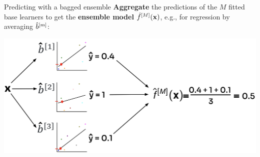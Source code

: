 \documentclass[11pt,compress,t,notes=noshow, xcolor=table]{beamer}
\begin{document}
\begin{vbframe}{Predicting with a bagged ensemble}
\textbf{Aggregate} the predictions of the $M$ fitted base learners to get the \textbf{ensemble model} $\hat f^{[M]}(\mathbf{x})$, e.g., for regression by averaging $\hat{b}^{[m]}$:

\begin{center}
\includegraphics[width=1\textwidth]{figure_man/forest-bagg_regr.png}
\end{center}
\end{vbframe}
\end{document}
